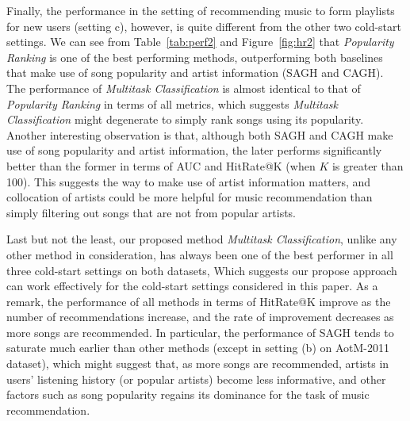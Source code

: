 Finally, the performance in the setting of recommending music to form playlists for new users (setting c),
however, is quite different from the other two cold-start settings.
%
We can see from Table~\ref{tab:perf2} and Figure~\ref{fig:hr2} that {\it Popularity Ranking} is one of the best performing methods,
outperforming both baselines that make use of song popularity and artist information (\ie SAGH and CAGH).
The performance of {\it Multitask Classification} is almost identical to that of {\it Popularity Ranking} in terms of all metrics,
which suggests {\it Multitask Classification} might degenerate to simply rank songs using its popularity.
Another interesting observation is that, although both SAGH and CAGH make use of song popularity and artist information,
the later performs significantly better than the former in terms of AUC and HitRate@K (when $K$ is greater than 100).
This suggests the way to make use of artist information matters,
and collocation of artists could be more helpful for music recommendation than simply filtering out songs 
that are not from popular artists.

Last but not the least, our proposed method {\it Multitask Classification}, unlike any other method in consideration,
has always been one of the best performer in all three cold-start settings on both datasets,
Which suggests our propose approach can work effectively for the cold-start settings considered in this paper.
As a remark, the performance of all methods in terms of HitRate@K improve as the number of recommendations increase,
and the rate of improvement decreases as more songs are recommended.
In particular, the performance of SAGH tends to saturate much earlier than other methods (except in setting (b) on AotM-2011 dataset),
which might suggest that, as more songs are recommended, artists in users' listening history (or popular artists) become less informative,
and other factors such as song popularity regains its dominance for the task of music recommendation.



